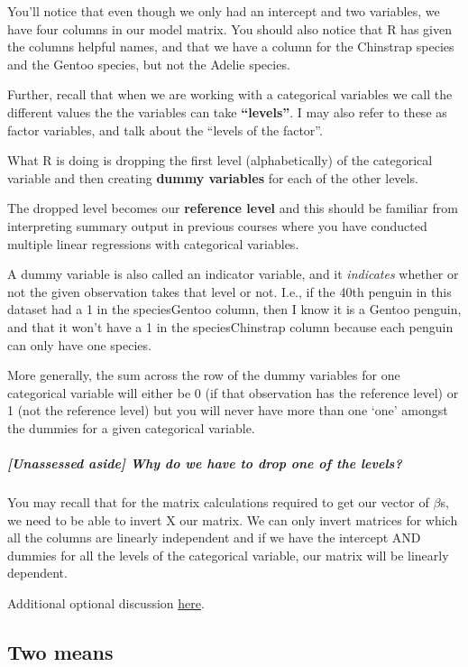\documentclass[
]{book}
\begin{document}
You'll notice that even though we only had an intercept and two variables, we have four columns in our model matrix. You should also notice that R has given the columns helpful names, and that we have a column for the Chinstrap species and the Gentoo species, but not the Adelie species.

Further, recall that when we are working with a categorical variables we call the different values the the variables can take \textbf{``levels''}. I may also refer to these as factor variables, and talk about the ``levels of the factor''.

What R is doing is dropping the first level (alphabetically) of the categorical variable and then creating \textbf{dummy variables} for each of the other levels.

The dropped level becomes our \textbf{reference level} and this should be familiar from interpreting summary output in previous courses where you have conducted multiple linear regressions with categorical variables.

A dummy variable is also called an indicator variable, and it \emph{indicates} whether or not the given observation takes that level or not. I.e., if the 40th penguin in this dataset had a 1 in the speciesGentoo column, then I know it is a Gentoo penguin, and that it won't have a 1 in the speciesChinstrap column because each penguin can only have one species.

More generally, the sum across the row of the dummy variables for one categorical variable will either be 0 (if that observation has the reference level) or 1 (not the reference level) but you will never have more than one `one' amongst the dummies for a given categorical variable.

\hypertarget{unassessed-aside-why-do-we-have-to-drop-one-of-the-levels}{%
\subparagraph{{[}Unassessed aside{]} Why do we have to drop one of the levels?}\label{unassessed-aside-why-do-we-have-to-drop-one-of-the-levels}}

You may recall that for the matrix calculations required to get our vector of \(\beta\)s, we need to be able to invert X our matrix. We can only invert matrices for which all the columns are linearly independent and if we have the intercept AND dummies for all the levels of the categorical variable, our matrix will be linearly dependent.

Additional optional discussion \protect\hyperlink{matrices}{here}.

\hypertarget{two-means}{%
\subsection{Two means}\label{two-means}}
\end{document}
